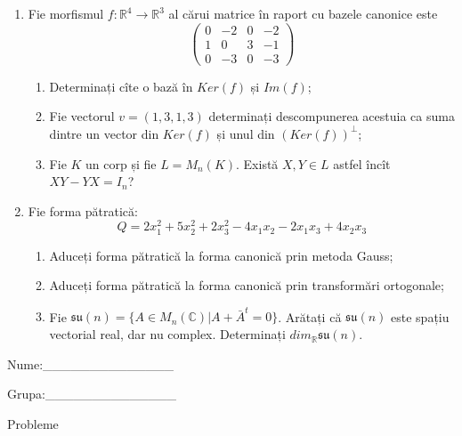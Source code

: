 \documentclass{article}
\begin{document}
\begin{enumerate}
 \item Fie morfismul $f:\mathbb{R}^4 \to \mathbb{R}^3$ al cărui matrice în raport cu bazele canonice este
$$\begin{pmatrix}
0&-2&0&-2\\
1&0&3&-1\\
0&-3&0&-3
\end{pmatrix}$$

\begin{enumerate}
\item Determinați cîte o bază în $Ker(f)$ și $Im(f)$;
\item Fie vectorul $v=(1,3,1,3)$ determinați descompunerea acestuia ca suma dintre un vector din $Ker(f)$ și unul din $(Ker(f))^\perp$;
\item Fie $K$ un corp și fie $L=M_n(K)$. Există $X,Y \in L$ astfel încît $XY-YX=I_n$?  
\end{enumerate}
\item Fie forma pătratică:
$$Q= 2x_1^2+5x_2^2+2x_3^2-4x_1x_2-2x_1x_3+4x_2x_3$$

\begin{enumerate}
\item Aduceți forma pătratică la forma canonică prin metoda Gauss;
\item Aduceți forma pătratică la forma canonică prin transformări ortogonale;
\item Fie $\mathfrak{su}(n)=\{ A \in M_n(\mathbb{C}) | A+\bar{A}^t=0\}$. Arătați că $\mathfrak{su}(n)$ este spațiu vectorial real, dar nu complex.
Determinați $dim_{\mathbb{R}}\mathfrak{su}(n)$.
\end{enumerate}
\end{enumerate}
\newpage
\begin{flushright}
Nume:\_\_\_\_\_\_\_\_\_\_\_\_\_\_
 
 
Grupa:\_\_\_\_\_\_\_\_\_\_\_\_\_\_
\end{flushright}
\begin{center}
\vspace{2cm}
{\Large Probleme}
\vspace{2cm}
\end{center}
\end{document}
